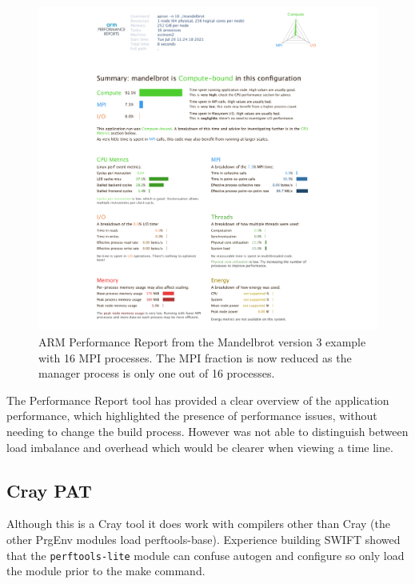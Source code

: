 \documentclass[a4paper,titlepage]{article}
\begin{document}
\begin{figure}[htbp]
\begin{center}
\includegraphics[scale=0.35]{figures/mandelbrot_v3_16procs_PerformanceReport}
\caption{ARM Performance Report from the Mandelbrot version 3 example with 16 MPI processes. The MPI fraction is now reduced as the manager process is only one out of 16 processes.}
\label{fig:perf-report_MB3_16procs}
\end{center}
\end{figure}

The Performance Report tool has provided a clear overview of the application performance, which highlighted the presence of performance issues, without needing to change the build process. However was not able to distinguish between load imbalance and overhead which would be clearer when viewing a time line.



\subsection{Cray PAT}

Although this is a Cray tool it does work with compilers other than Cray (the other PrgEnv modules load perftools-base). Experience building SWIFT showed that the \texttt{perftools-lite} module can confuse autogen and configure so only load the module prior to the make command. 
\end{document}
